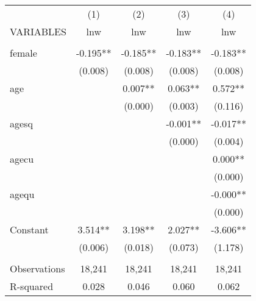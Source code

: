 \begin{tabular}{lcccc} \hline
 & (1) & (2) & (3) & (4) \\
VARIABLES & lnw & lnw & lnw & lnw \\ \hline
 &  &  &  &  \\
female & -0.195** & -0.185** & -0.183** & -0.183** \\
 & (0.008) & (0.008) & (0.008) & (0.008) \\
age &  & 0.007** & 0.063** & 0.572** \\
 &  & (0.000) & (0.003) & (0.116) \\
agesq &  &  & -0.001** & -0.017** \\
 &  &  & (0.000) & (0.004) \\
agecu &  &  &  & 0.000** \\
 &  &  &  & (0.000) \\
agequ &  &  &  & -0.000** \\
 &  &  &  & (0.000) \\
Constant & 3.514** & 3.198** & 2.027** & -3.606** \\
 & (0.006) & (0.018) & (0.073) & (1.178) \\
 &  &  &  &  \\
Observations & 18,241 & 18,241 & 18,241 & 18,241 \\
 R-squared & 0.028 & 0.046 & 0.060 & 0.062 \\ \hline
\end{tabular}
